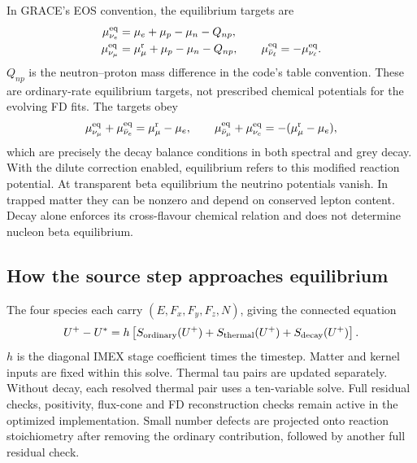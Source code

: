 \documentclass[10pt,a4paper]{article}
\newcommand{\mueff}{\mu_\mu^{\mathrm{r}}}
\begin{document}
In GRACE's EOS convention, the equilibrium targets are
\begin{align}
 \mu_{\nu_e}^{\rm eq}&=\mu_e+\mu_p-\mu_n-Q_{np},\\
 \mu_{\nu_\mu}^{\rm eq}&=\mueff+\mu_p-\mu_n-Q_{np},\qquad
 \mu_{\bar\nu_\ell}^{\rm eq}=-\mu_{\nu_\ell}^{\rm eq}.
\end{align}
$Q_{np}$ is the neutron--proton mass difference in the code's table convention.
These are ordinary-rate equilibrium targets, not prescribed chemical potentials
for the evolving FD fits. The targets obey
\begin{equation}
 \mu_{\nu_\mu}^{\rm eq}+\mu_{\bar\nu_e}^{\rm eq}=\mueff-\mu_e,
 \qquad
 \mu_{\bar\nu_\mu}^{\rm eq}+\mu_{\nu_e}^{\rm eq}=-(\mueff-\mu_e),
\end{equation}
which are precisely the decay balance conditions in both spectral and grey
decay. With the dilute correction enabled, equilibrium refers to this modified
reaction potential. At transparent beta equilibrium the neutrino potentials
vanish. In trapped matter they can be nonzero and depend on conserved lepton
content. Decay alone enforces its cross-flavour chemical relation and does
not determine nucleon beta equilibrium.

\subsection{How the source step approaches equilibrium}
The four species each carry $(E,F_x,F_y,F_z,N)$, giving the connected equation
\begin{equation}
 U^{+}-U^*=h\left[S_{\rm ordinary}(U^{+})+
 S_{\rm thermal}(U^{+})+S_{\rm decay}(U^{+})\right].
\end{equation}
$h$ is the diagonal IMEX stage coefficient times the timestep. Matter and
kernel inputs are fixed within this solve. Thermal tau pairs are updated
separately. Without decay, each resolved thermal pair uses a ten-variable solve.
Full residual checks, positivity, flux-cone and FD reconstruction checks remain
active in the optimized implementation. Small number defects are projected onto
reaction stoichiometry after removing the ordinary contribution, followed by
another full residual check.
\end{document}
